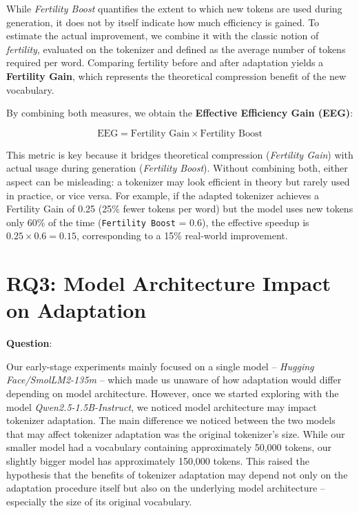 While \textit{Fertility Boost} quantifies the extent to which new tokens are used during generation, it does not by itself indicate how much efficiency is gained. To estimate the actual improvement, we combine it with the classic notion of \textit{fertility}, evaluated on the tokenizer and defined as the average number of tokens required per word. Comparing fertility before and after adaptation yields a \textbf{Fertility Gain}, which represents the theoretical compression benefit of the new vocabulary.

By combining both measures, we obtain the \textbf{Effective Efficiency Gain (EEG)}:

$$
\text{EEG} = \text{Fertility Gain} \times \text{Fertility Boost}
$$

This metric is key because it bridges theoretical compression (\textit{Fertility Gain})  with actual usage during generation (\textit{Fertility Boost}). Without combining both, either aspect can be misleading: a tokenizer may look efficient in theory but rarely used in practice, or vice versa. For example, if the adapted tokenizer achieves a Fertility Gain of 0.25 (25\% fewer tokens per word) but the model uses new tokens only 60\% of the time (\texttt{Fertility Boost} = 0.6), the effective speedup is $0.25 \times 0.6 = 0.15$, corresponding to a 15\% real-world improvement.


\section{RQ3: Model Architecture Impact on Adaptation}
\label{sec:model_impact}
\textbf{Question}: \textit{\RQthree}


Our early-stage experiments mainly focused on a single model -- \textit{Hugging Face/SmolLM2-135m} -- which made us unaware of how adaptation would differ depending on model architecture. However, once we started exploring with the model \textit{Qwen2.5-1.5B-Instruct}, we noticed model architecture may impact tokenizer adaptation. The main difference we noticed between the two models that may affect tokenizer adaptation was the original tokenizer's size. While our smaller model had a vocabulary containing approximately 50,000 tokens, our slightly bigger model has approximately 150,000 tokens. This raised the hypothesis that the benefits of tokenizer adaptation may depend not only on the adaptation procedure itself but also on the underlying model architecture -- especially the size of its original vocabulary.



